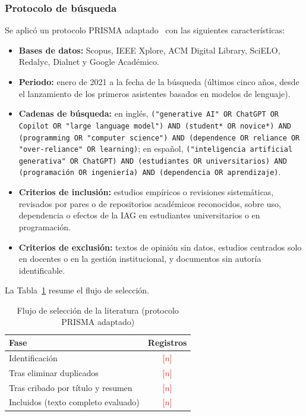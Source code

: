 \documentclass[12pt,letterpaper]{article}
\numberwithin{table}{section}
\numberwithin{figure}{section}
\newcommand{\pendiente}[1]{\textcolor{red}{[#1]}}
\begin{document}
\subsubsection{Protocolo de búsqueda}

Se aplicó un protocolo PRISMA adaptado~\cite{page2021prisma} con las siguientes características:

\begin{itemize}
  \item \textbf{Bases de datos:} Scopus, IEEE Xplore, ACM Digital Library, SciELO, Redalyc, Dialnet y Google Académico.
  \item \textbf{Periodo:} enero de 2021 a la fecha de la búsqueda (últimos cinco años, desde el lanzamiento de los primeros asistentes basados en modelos de lenguaje).
  \item \textbf{Cadenas de búsqueda:} en inglés, \texttt{("generative AI" OR ChatGPT OR Copilot OR "large language model") AND (student* OR novice*) AND (programming OR "computer science") AND (dependence OR reliance OR "over-reliance" OR learning)}; en español, \texttt{("inteligencia artificial generativa" OR ChatGPT) AND (estudiantes OR universitarios) AND (programación OR ingeniería) AND (dependencia OR aprendizaje)}.
  \item \textbf{Criterios de inclusión:} estudios empíricos o revisiones sistemáticas, revisados por pares o de repositorios académicos reconocidos, sobre uso, dependencia o efectos de la IAG en estudiantes universitarios o en programación.
  \item \textbf{Criterios de exclusión:} textos de opinión sin datos, estudios centrados solo en docentes o en la gestión institucional, y documentos sin autoría identificable.
\end{itemize}

La Tabla~\ref{tab:prisma} resume el flujo de selección.

\begin{table}[ht]
\centering
\caption{Flujo de selección de la literatura (protocolo PRISMA adaptado)}
\label{tab:prisma}
\small
\begin{tabular}{@{}lc@{}}
\toprule
\textbf{Fase} & \textbf{Registros} \\
\midrule
Identificación & \pendiente{$n$} \\
Tras eliminar duplicados & \pendiente{$n$} \\
Tras cribado por título y resumen & \pendiente{$n$} \\
Incluidos (texto completo evaluado) & \pendiente{$n$} \\
\bottomrule
\end{tabular}
\end{table}
\end{document}
